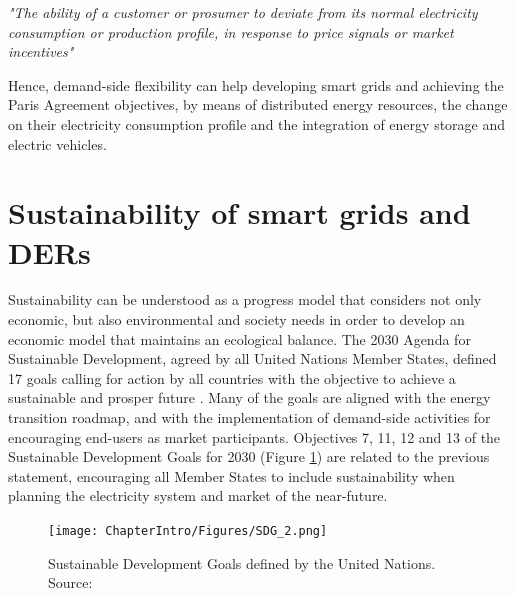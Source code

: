 \begin{tcolorbox}
\textit{"The ability of a customer or prosumer to deviate from its normal electricity consumption or production profile, in response to price signals or market incentives"} 
\end{tcolorbox}

Hence, demand-side flexibility can help developing smart grids and achieving the Paris Agreement objectives, by means of distributed energy resources, the change on their electricity consumption profile and the integration of energy storage and electric vehicles. 
%


\section{Sustainability of smart grids and DERs}
Sustainability can be understood as a progress model that considers not only economic, but also environmental and society needs in order to develop an economic model that maintains an ecological balance. The 2030 Agenda for Sustainable Development, agreed by all United Nations Member States, defined 17 goals calling for action by all countries with the objective to achieve a sustainable and prosper future \cite{SDGOALS2015}. Many of the goals are aligned with the energy transition roadmap, and with the implementation of demand-side activities for encouraging end-users as market participants. Objectives 7, 11, 12 and 13 of the Sustainable Development Goals for 2030 (Figure \ref{fig:sdg}) are related to the previous statement, encouraging all Member States to include sustainability when planning the electricity system and market of the near-future.  

\begin{figure}[h]
	\centering 
	\texttt{[image: ChapterIntro/Figures/SDG\_2.png]}
		\caption{Sustainable Development Goals defined by the United Nations. Source: \cite{UnitedNations2020}}  
		\label{fig:sdg}
\end{figure}    

